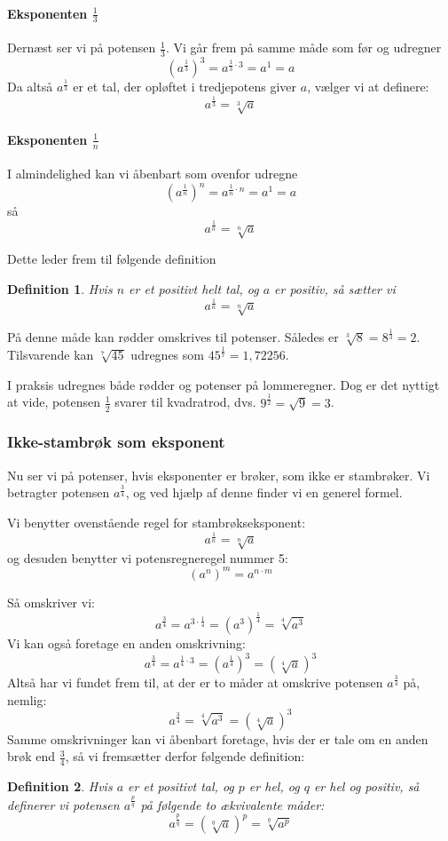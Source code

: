 \documentclass[12pt,oneside,a4paper]{article}
\theoremstyle{plain}
\newtheorem*{mydef}{Definition}
\begin{document}
\paragraph*{Eksponenten $\frac13$}
Dernæst ser vi på potensen $\frac13$. Vi går frem på samme måde som før og
udregner
$$
\left(a^{\frac13}\right)^3 = a^{\frac13 \cdot 3} = a^1 = a
$$
Da altså $a^\frac13$ er et tal, der opløftet i tredjepotens giver $a$, vælger
vi at definere:
$$
a^\frac13 = \sqrt[3]{a}
$$

\paragraph*{Eksponenten $\frac1n$}
I almindelighed kan vi åbenbart som ovenfor udregne
$$
\left(a^{\frac1n}\right)^n = a^{\frac1n \cdot n} = a^1 = a
$$
så
$$
a^\frac1n = \sqrt[n]{a}
$$

Dette leder frem til følgende definition
\begin{mydef}
    Hvis $n$ er et positivt helt tal, og $a$ er positiv, så sætter vi
    $$
    a^\frac1n = \sqrt[n]{a}
    $$
\end{mydef}

På denne måde kan rødder omskrives til potenser. Således er $\sqrt[3]{8} =
8^{\frac13} = 2$.  Tilsvarende kan $\sqrt[7]{45}$ udregnes som $45^\frac17 =
1,72256$.

I praksis udregnes både rødder og potenser på lommeregner. Dog er det nyttigt
at vide, potensen $\frac12$ svarer til kvadratrod, dvs. $9^\frac12 = \sqrt{9} =
3$.

\subsubsection*{Ikke-stambrøk som eksponent}
Nu ser vi på potenser, hvis eksponenter er brøker, som ikke er stambrøker.
Vi betragter potensen $a^{\frac34}$, og ved hjælp af denne finder vi en generel
formel.

Vi benytter ovenstående regel for stambrøkseksponent:
$$
a^\frac1n = \sqrt[n]{a}
$$
og desuden benytter vi potensregneregel nummer 5:
$$
\left(a^n\right)^m = a^{n\cdot m}
$$

Så omskriver vi:
$$
a^{\frac34} = a^{3\cdot \frac14} = \left(a^3\right)^\frac14 = \sqrt[4]{a^3}
$$
Vi kan også foretage en anden omskrivning:
$$
a^{\frac34} = a^{\frac14 \cdot 3} = \left(a^\frac14\right)^3 =
\left(\sqrt[4]{a}\right)^3
$$
Altså har vi fundet frem til, at der er to måder at omskrive potensen $a^\frac34$ på, nemlig:
$$
a^\frac34 = \sqrt[4]{a^3} = \left(\sqrt[4]{a}\right)^3
$$
Samme omskrivninger kan vi åbenbart foretage, hvis der er tale om en anden brøk
end $\frac34$, så vi fremsætter derfor følgende definition:
\begin{mydef}
    Hvis $a$ er et positivt tal, og $p$ er hel, og $q$ er hel og positiv, så
    definerer vi potensen $a^\frac{p}{q}$ på følgende to ækvivalente måder:
    $$
    a^\frac{p}{q} = \left(\sqrt[q]{a}\right)^p = \sqrt[q]{a^p}
    $$
\end{mydef}
\end{document}
